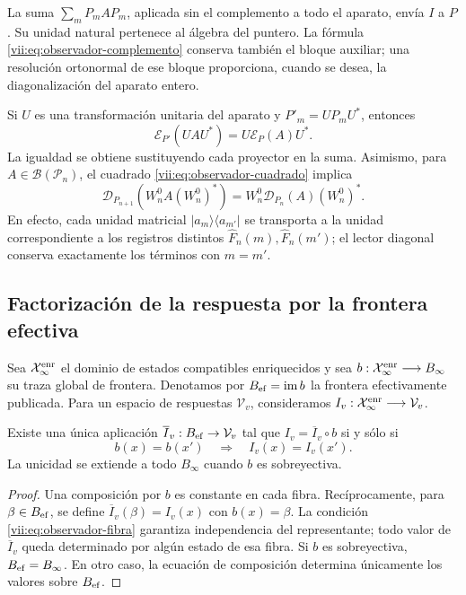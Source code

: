 La suma \(\sum_mP_mAP_m\), aplicada sin el complemento a todo el
aparato, envía \(I\) a \(P\). Su unidad natural pertenece al álgebra
del puntero. La fórmula \eqref{vii:eq:observador-complemento} conserva
también el bloque auxiliar; una resolución ortonormal de ese bloque
proporciona, cuando se desea, la diagonalización del aparato entero.

Si \(U\) es una transformación unitaria del aparato y
\(P'_m=UP_mU^*\), entonces
\[
 \mathcal E_{P'}(UAU^*)=U\mathcal E_P(A)U^*.
\]
La igualdad se obtiene sustituyendo cada proyector en la suma.
Asimismo, para \(A\in\mathcal B(\mathcal P_n)\), el cuadrado
\eqref{vii:eq:observador-cuadrado} implica
\[
 \mathcal D_{P_{n+1}}(W_n^0A(W_n^0)^*)
 =W_n^0\mathcal D_{P_n}(A)(W_n^0)^*.
\]
En efecto, cada unidad matricial \(|a_m\rangle\langle a_{m'}|\)
se transporta a la unidad correspondiente a los registros distintos
\(\widehat F_n(m),\widehat F_n(m')\); el lector diagonal conserva
exactamente los términos con \(m=m'\).

\subsection{Factorización de la respuesta por la frontera efectiva}
\label{vii:sec:observador-factorizacion}

Sea \(\mathcal X_\infty^{\rm enr}\) el dominio de estados compatibles
enriquecidos y sea
\(b:\mathcal X_\infty^{\rm enr}\longrightarrow B_\infty\) su traza
global de frontera. Denotamos por \(B_{\rm ef}=\operatorname{im}b\)
la frontera efectivamente publicada. Para un espacio de respuestas
\(\mathcal V_v\), consideramos
\(I_v:\mathcal X_\infty^{\rm enr}\longrightarrow\mathcal V_v\).

\begin{theorem}
\label{vii:thm:observador-factorizacion}
Existe una única aplicación \(\overline I_v:B_{\rm ef}\to\mathcal V_v\)
tal que \(I_v=\overline I_v\circ b\) si y sólo si
\begin{equation}
 b(x)=b(x')\quad\Longrightarrow\quad I_v(x)=I_v(x').
 \label{vii:eq:observador-fibra}
\end{equation}
La unicidad se extiende a todo \(B_\infty\) cuando \(b\) es
sobreyectiva.
\end{theorem}

\begin{proof}
Una composición por \(b\) es constante en cada fibra. Recíprocamente,
para \(\beta\in B_{\rm ef}\), se define
\(\overline I_v(\beta)=I_v(x)\) con \(b(x)=\beta\).
La condición \eqref{vii:eq:observador-fibra} garantiza independencia
del representante; todo valor de \(\overline I_v\) queda determinado
por algún estado de esa fibra. Si \(b\) es sobreyectiva,
\(B_{\rm ef}=B_\infty\). En otro caso, la ecuación de composición
determina únicamente los valores sobre \(B_{\rm ef}\).
\end{proof}

